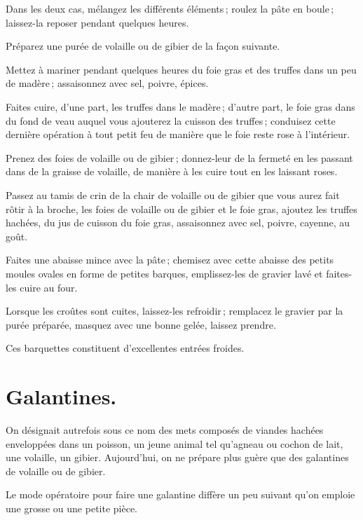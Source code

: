 Dans les deux cas, mélangez les différents éléments ; roulez la pâte en boule ;
laissez-la reposer pendant quelques heures.

Préparez une purée de volaille ou de gibier de la façon suivante.

Mettez à mariner pendant quelques heures du foie gras et des truffes dans un
peu de madère ; assaisonnez avec sel, poivre, épices.

Faites cuire, d'une part, les truffes dans le madère ; d'autre part, le foie
gras dans du fond de veau auquel vous ajouterez la cuisson des truffes ;
conduisez cette dernière opération à tout petit feu de manière que le foie
reste rose à l'intérieur.

Prenez des foies de volaille ou de gibier ; donnez-leur de la fermeté en les
passant dans de la graisse de volaille, de manière à les cuire tout en les
laissant roses.

Passez au tamis de crin de la chair de volaille ou de gibier que vous aurez
fait rôtir à la broche, les foies de volaille ou de gibier et le foie gras,
ajoutez les truffes hachées, du jus de cuisson du foie gras, assaisonnez avec
sel, poivre, cayenne, au goût.

Faites une abaisse mince avec la pâte ; chemisez avec cette abaisse des petits
moules ovales en forme de petites barques, emplissez-les de gravier lavé et
faites-les cuire au four.

Lorsque les croûtes sont cuites, laissez-les refroidir ; remplacez le gravier
par la purée préparée, masquez avec une bonne gelée, laissez prendre.

Ces barquettes constituent d'excellentes entrées froides.

\section*{\centering Galantines.}
{}

On désignait autrefois sous ce nom des mets composés de viandes hachées
enveloppées dans un poisson, un jeune animal tel qu'agneau ou cochon de lait,
une volaille, un gibier. Aujourd'hui, on ne prépare plus guère que des
galantines de volaille ou de gibier.

Le mode opératoire pour faire une galantine diffère un peu suivant qu'on
emploie une grosse ou une petite pièce.


